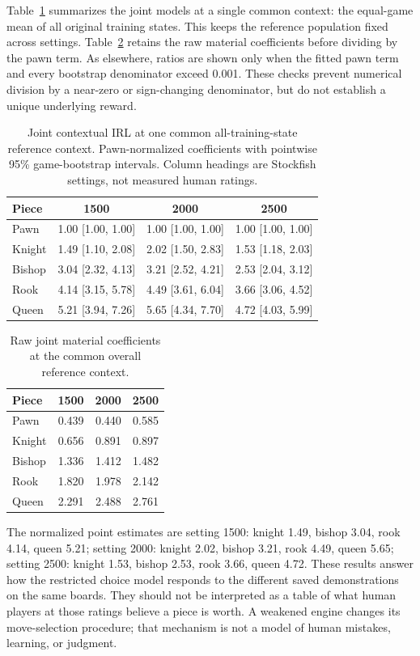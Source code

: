 \documentclass{jcst}
\begin{document}
Table~\ref{tab:elovalues} summarizes the joint models at a single common context: the equal-game mean of all original training states. This keeps the reference population fixed across settings. Table~\ref{tab:eloraw} retains the raw material coefficients before dividing by the pawn term. As elsewhere, ratios are shown only when the fitted pawn term and every bootstrap denominator exceed 0.001. These checks prevent numerical division by a near-zero or sign-changing denominator, but do not establish a unique underlying reward.
\begin{table}[t]\centering
\small
\caption{Joint contextual IRL at one common all-training-state reference context. Pawn-normalized coefficients with pointwise 95\% game-bootstrap intervals. Column headings are Stockfish settings, not measured human ratings.}\label{tab:elovalues}
\begin{tabular}{lccc}
\toprule
Piece & 1500 & 2000 & 2500\\\midrule
Pawn & 1.00 [1.00, 1.00] & 1.00 [1.00, 1.00] & 1.00 [1.00, 1.00]\\
Knight & 1.49 [1.10, 2.08] & 2.02 [1.50, 2.83] & 1.53 [1.18, 2.03]\\
Bishop & 3.04 [2.32, 4.13] & 3.21 [2.52, 4.21] & 2.53 [2.04, 3.12]\\
Rook & 4.14 [3.15, 5.78] & 4.49 [3.61, 6.04] & 3.66 [3.06, 4.52]\\
Queen & 5.21 [3.94, 7.26] & 5.65 [4.34, 7.70] & 4.72 [4.03, 5.99]\\
\bottomrule\end{tabular}\end{table}
\begin{table}[tbp]\centering
\small
\caption{Raw joint material coefficients at the common overall reference context.}\label{tab:eloraw}
\begin{tabular}{lrrr}
\toprule
Piece & 1500 & 2000 & 2500\\\midrule
Pawn & 0.439 & 0.440 & 0.585\\
Knight & 0.656 & 0.891 & 0.897\\
Bishop & 1.336 & 1.412 & 1.482\\
Rook & 1.820 & 1.978 & 2.142\\
Queen & 2.291 & 2.488 & 2.761\\
\bottomrule\end{tabular}\end{table}

The normalized point estimates are setting 1500: knight 1.49, bishop 3.04, rook 4.14, queen 5.21; setting 2000: knight 2.02, bishop 3.21, rook 4.49, queen 5.65; setting 2500: knight 1.53, bishop 2.53, rook 3.66, queen 4.72. These results answer how the restricted choice model responds to the different saved demonstrations on the same boards. They should not be interpreted as a table of what human players at those ratings believe a piece is worth. A weakened engine changes its move-selection procedure; that mechanism is not a model of human mistakes, learning, or judgment.
\end{document}
